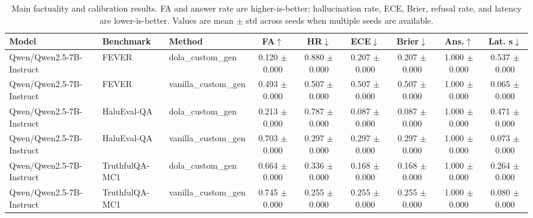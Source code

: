 \begin{table}[t]
\centering
\caption{Main factuality and calibration results. FA and answer rate are higher-is-better; hallucination rate, ECE, Brier, refusal rate, and latency are lower-is-better. Values are mean $\pm$ std across seeds when multiple seeds are available.}
\label{tab:main_results}
\small
\begin{tabular}{lllcccccc}
\toprule
Model & Benchmark & Method & FA$\uparrow$ & HR$\downarrow$ & ECE$\downarrow$ & Brier$\downarrow$ & Ans.$\uparrow$ & Lat. s$\downarrow$ \\
\midrule
Qwen/Qwen2.5-7B-Instruct & FEVER & dola\_custom\_gen & 0.120 $\pm$ 0.000 & 0.880 $\pm$ 0.000 & 0.207 $\pm$ 0.000 & 0.207 $\pm$ 0.000 & 1.000 $\pm$ 0.000 & 0.537 $\pm$ 0.000 \\
Qwen/Qwen2.5-7B-Instruct & FEVER & vanilla\_custom\_gen & 0.493 $\pm$ 0.000 & 0.507 $\pm$ 0.000 & 0.507 $\pm$ 0.000 & 0.507 $\pm$ 0.000 & 1.000 $\pm$ 0.000 & 0.065 $\pm$ 0.000 \\
Qwen/Qwen2.5-7B-Instruct & HaluEval-QA & dola\_custom\_gen & 0.213 $\pm$ 0.000 & 0.787 $\pm$ 0.000 & 0.087 $\pm$ 0.000 & 0.087 $\pm$ 0.000 & 1.000 $\pm$ 0.000 & 0.471 $\pm$ 0.000 \\
Qwen/Qwen2.5-7B-Instruct & HaluEval-QA & vanilla\_custom\_gen & 0.703 $\pm$ 0.000 & 0.297 $\pm$ 0.000 & 0.297 $\pm$ 0.000 & 0.297 $\pm$ 0.000 & 1.000 $\pm$ 0.000 & 0.073 $\pm$ 0.000 \\
Qwen/Qwen2.5-7B-Instruct & TruthfulQA-MC1 & dola\_custom\_gen & 0.664 $\pm$ 0.000 & 0.336 $\pm$ 0.000 & 0.168 $\pm$ 0.000 & 0.168 $\pm$ 0.000 & 1.000 $\pm$ 0.000 & 0.264 $\pm$ 0.000 \\
Qwen/Qwen2.5-7B-Instruct & TruthfulQA-MC1 & vanilla\_custom\_gen & 0.745 $\pm$ 0.000 & 0.255 $\pm$ 0.000 & 0.255 $\pm$ 0.000 & 0.255 $\pm$ 0.000 & 1.000 $\pm$ 0.000 & 0.080 $\pm$ 0.000 \\
\bottomrule
\end{tabular}
\end{table}
